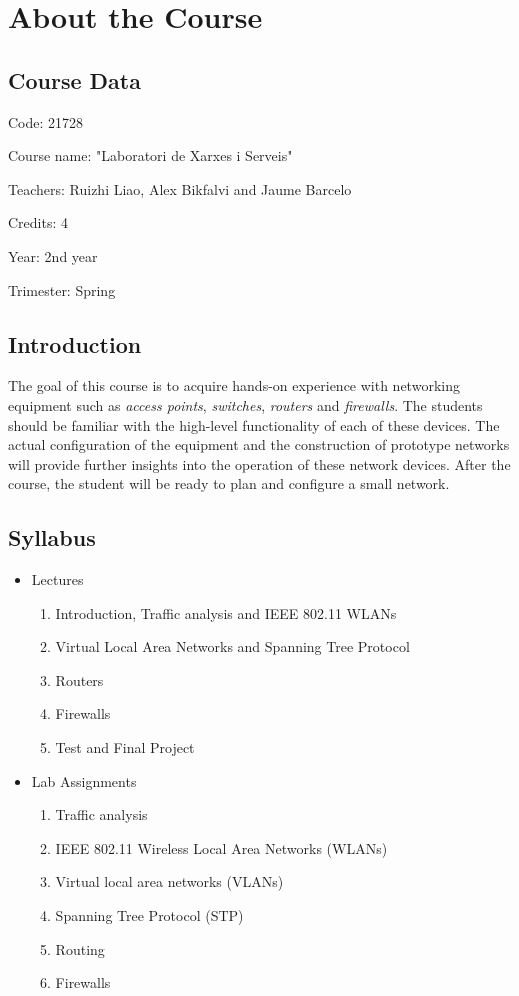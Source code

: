 \chapter{About the Course}

\section{Course Data}

Code: 21728

Course name: "Laboratori de Xarxes i Serveis"

Teachers: Ruizhi Liao, Alex Bikfalvi and Jaume Barcelo

Credits: 4

Year: 2nd year

Trimester: Spring

\section{Introduction}

The goal of this course is to acquire hands-on experience with networking equipment such as \emph{access points}, \emph{switches}, \emph{routers} and \emph{firewalls}. The students should be familiar with the high-level functionality of each of these devices. The actual configuration of the equipment and the construction of prototype networks will provide further insights into the operation of these network devices. After the course, the student will be ready to plan and configure a small network.

\section{Syllabus}
\begin{itemize}
  \item Lectures
  \begin{enumerate}
    \item Introduction, Traffic analysis and IEEE 802.11 WLANs
    \item Virtual Local Area Networks and Spanning Tree Protocol
    \item Routers
    \item Firewalls
    \item Test and Final Project
  \end{enumerate}
\item Lab Assignments
  \begin{enumerate}
    \item Traffic analysis
    \item IEEE 802.11 Wireless Local Area Networks (WLANs)
    \item Virtual local area networks (VLANs)
    \item Spanning Tree Protocol (STP)
    \item Routing
    \item Firewalls
  \end{enumerate}
\end{itemize}

